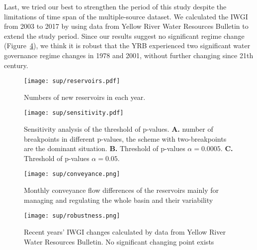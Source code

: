 Last, we tried our best to strengthen the period of this study despite the limitations of time span of the multiple-source dataset. We calculated the IWGI from 2003 to 2017 by using data from Yellow River Water Resources Bulletin to extend the study period. Since our results suggest no significant regime change (Figure~\ref{fig:recent}), we think it is robust that the YRB experienced two significant water governance regime changes in 1978 and 2001, without further changing since 21th century.

\begin{figure}[tb]
    \centering
    \texttt{[image: sup/reservoirs.pdf]}
    \caption{
          Numbers of new reservoirs in each year.
    }\label{fig:reservoirs}
\end{figure}

\begin{figure}
    \centering
    \texttt{[image: sup/sensitivity.pdf]}
    \caption{
          Sensitivity analysis of the threshold of p-values.
          \textbf{A.} number of breakpoints in different p-values, the scheme with two-breakpoints are the dominant situation.
          \textbf{B.} Threshold of p-values \(\alpha=0.0005\).
          \textbf{C.} Threshold of p-values \(\alpha=0.05\).
    }\label{fig:sensitivity}
\end{figure}


\begin{figure}[htb]
    \centering
    \texttt{[image: sup/conveyance.png]}
    \caption{Monthly conveyance flow differences of the reservoirs mainly for managing and regulating the whole basin and their variability}\label{fig:conveyance}
\end{figure}


\begin{figure}[!htb]
	\centering
	\texttt{[image: sup/robustness.png]}
	\caption{Recent years' IWGI changes calculated by data from Yellow River Water Resources Bulletin. No significant changing point exists}\label{fig:recent}
\end{figure}
